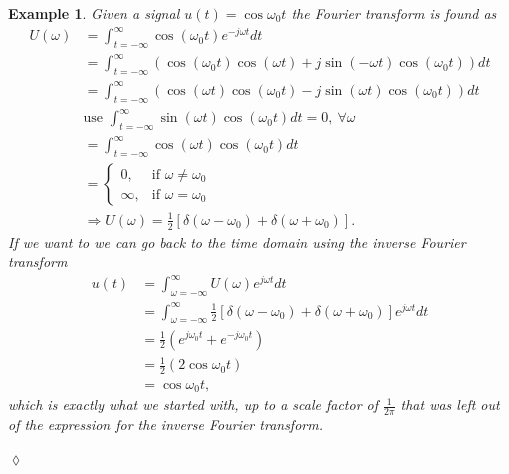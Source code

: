 \documentclass[lecture,12pt,]{pcms-l}
\theoremstyle{example}
\newtheorem{example}{Example}[section]
\newcommand{\tint}{\int_{t=-\infty}^\infty}
\newcommand{\fint}{\int_{\omega=-\infty}^\infty}
\newcommand{\w}{\omega}
\newcommand{\wo}{\omega_0}
\begin{document}
\begin{example}
Given a signal $u(t)=\cos\wo t$ the Fourier transform is found as
\begin{align*}
U(\w) &= \tint \cos(\wo t)e^{-j\w t}dt \\
&= \tint \left(\cos(\wo t)\cos(\w t) + j\sin(-\w t)\cos(\wo t)\right)dt \\
&= \tint \left(\cos(\w t)\cos(\wo t) - j\sin(\w t)\cos(\wo t)\right)dt \\
&\text{use }\tint \sin(\w t)\cos(\wo t)dt = 0, ~ \forall \w \\
&= \tint \cos(\w t)\cos(\wo t)dt \\
&= \begin{cases} 0, & \text{if } \w \neq \wo \\ \infty, & \text{if } \w = \wo \end{cases} \\
&\Rightarrow U(\w) = \frac{1}{2} \left[\delta(\w-\wo) + \delta(\w+\wo)\right].
\end{align*}
If we want to we can go back to the time domain using the inverse Fourier transform
\begin{align*}
u(t) &= \fint U(\w)e^{j\w t}dt \\
&= \fint \frac{1}{2} \left[\delta(\w-\wo) + \delta(\w+\wo)\right] e^{j\w t}dt \\
&= \frac{1}{2}\left(e^{j\wo t} + e^{-j\wo t}\right) \\
&= \frac{1}{2}\left(2\cos\wo t\right) \\
&= \cos\wo t,
\end{align*}
which is exactly what we started with, up to a scale factor of $\frac{1}{2\pi}$ that was left out of the expression for the inverse Fourier transform.
\end{example}
$\lozenge$
\end{document}
